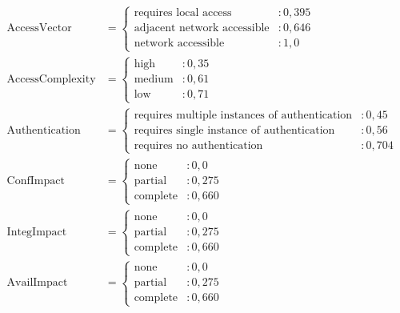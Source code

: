 \[
\begin{aligned}
\text{AccessVector} & = 
\begin{cases} 
    \text{requires local access} & : 0{,}395 \\
    \text{adjacent network accessible} & : 0{,}646 \\
    \text{network accessible} & : 1{,}0
\end{cases} \\[10pt]
\text{AccessComplexity} & = 
\begin{cases} 
    \text{high} & : 0{,}35 \\
    \text{medium} & : 0{,}61 \\
    \text{low} & : 0{,}71
\end{cases} \\[10pt]
\text{Authentication} & = 
\begin{cases} 
    \text{requires multiple instances of authentication} & : 0{,}45 \\
    \text{requires single instance of authentication} & : 0{,}56 \\
    \text{requires no authentication} & : 0{,}704
\end{cases} \\[10pt]
\text{ConfImpact} & = 
\begin{cases} 
    \text{none} & : 0{,}0 \\
    \text{partial} & : 0{,}275 \\
    \text{complete} & : 0{,}660
\end{cases} \\[10pt]
\text{IntegImpact} & = 
\begin{cases} 
    \text{none} & : 0{,}0 \\
    \text{partial} & : 0{,}275 \\
    \text{complete} & : 0{,}660
\end{cases} \\[10pt]
\text{AvailImpact} & = 
\begin{cases} 
    \text{none} & : 0{,}0 \\
    \text{partial} & : 0{,}275 \\
    \text{complete} & : 0{,}660
\end{cases}
\end{aligned}
\]


